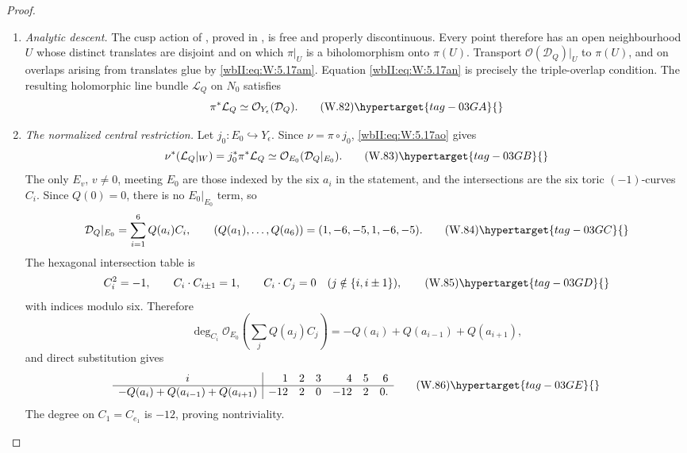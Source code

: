 \begin{proof}
\begin{enumerate}[label=\arabic*.,leftmargin=*]
Use the divisor-sheaf convention
\[
 \mathcal O(D)(U)=
 \{g\in\mathcal M_Y(U):
   \operatorname{div}(g)+D|_U\geq0\}.
\]
If \(D'=D+\operatorname{div}(f)\), multiplication by \(f\) maps
\(\mathcal O(D')\) isomorphically to \(\mathcal O(D)\).  Thus
\eqref{wbII:eq:W:5.17ad} and \eqref{wbII:eq:W:5.17ag} define
\[
 \theta_\lambda:
 \Psi_\lambda^*\mathcal O(\mathcal D_Q)
 \xrightarrow{\ \times f_\lambda\ }
 \mathcal O(\mathcal D_Q).
\tag{W.80}\hypertarget{tag-03G8}{}\label{wbII:eq:W:5.17am}
\]
Because
\((\Psi_\lambda\Psi_\mu)^*=\Psi_\mu^*\Psi_\lambda^*\),
equation \eqref{wbII:eq:W:5.17al} is exactly
\[
 \theta_{\lambda+\mu}
 =\theta_\mu\circ\Psi_\mu^*\theta_\lambda.
\tag{W.81}\hypertarget{tag-03G9}{}\label{wbII:eq:W:5.17an}
\]

\item \emph{Analytic descent.}
The cusp action of , proved in
, is
free and properly discontinuous.  Every point therefore has an open
neighbourhood \(U\) whose distinct translates are disjoint and on which
\(\pi|_U\) is a biholomorphism onto \(\pi(U)\).  Transport
\(\mathcal O(\mathcal D_Q)|_U\) to \(\pi(U)\), and on overlaps arising
from translates glue by \eqref{wbII:eq:W:5.17am}.  Equation \eqref{wbII:eq:W:5.17an} is precisely the
triple-overlap condition.  The resulting holomorphic line bundle
\(\mathcal L_Q\) on \(N_0\) satisfies
\[
 \pi^*\mathcal L_Q
 \simeq\mathcal O_{Y_\epsilon}(\mathcal D_Q).
\tag{W.82}\hypertarget{tag-03GA}{}\label{wbII:eq:W:5.17ao}
\]

\item \emph{The normalized central restriction.}
Let \(j_0:E_0\hookrightarrow Y_\epsilon\).  Since
\(\nu=\pi\circ j_0\), \eqref{wbII:eq:W:5.17ao} gives
\[
 \nu^*(\mathcal L_Q|_W)
 =j_0^*\pi^*\mathcal L_Q
 \simeq\mathcal O_{E_0}(\mathcal D_Q|_{E_0}).
\tag{W.83}\hypertarget{tag-03GB}{}\label{wbII:eq:W:5.17ap}
\]
The only \(E_v\), \(v\ne0\), meeting \(E_0\) are those indexed by the
six \(a_i\) in the statement, and the intersections are the six toric
\((-1)\)-curves \(C_i\).  Since \(Q(0)=0\), there is no
\(E_0|_{E_0}\) term, so
\[
 \mathcal D_Q|_{E_0}
 =\sum_{i=1}^6Q(a_i)C_i,
 \qquad
 (Q(a_1),\ldots,Q(a_6))=(1,-6,-5,1,-6,-5).
\tag{W.84}\hypertarget{tag-03GC}{}\label{wbII:eq:W:5.17aq}
\]
The hexagonal intersection table is
\[
 C_i^2=-1,
 \qquad
 C_i\cdot C_{i\pm1}=1,
 \qquad
 C_i\cdot C_j=0
 \quad(j\notin\{i,i\pm1\}),
\tag{W.85}\hypertarget{tag-03GD}{}\label{wbII:eq:W:5.17ar}
\]
with indices modulo six.  Therefore
\[
 \deg_{C_i}\mathcal O_{E_0}
 \!\left(\sum_jQ(a_j)C_j\right)
 =-Q(a_i)+Q(a_{i-1})+Q(a_{i+1}),
\]
and direct substitution gives
\[
 \begin{array}{c|rrrrrr}
 i&1&2&3&4&5&6\\ \hline
 -Q(a_i)+Q(a_{i-1})+Q(a_{i+1})
 &-12&2&0&-12&2&0.
 \end{array}
\tag{W.86}\hypertarget{tag-03GE}{}\label{wbII:eq:W:5.17as}
\]
The degree on \(C_1=C_{e_1}\) is \(-12\), proving nontriviality.


\end{enumerate}
\end{proof}
